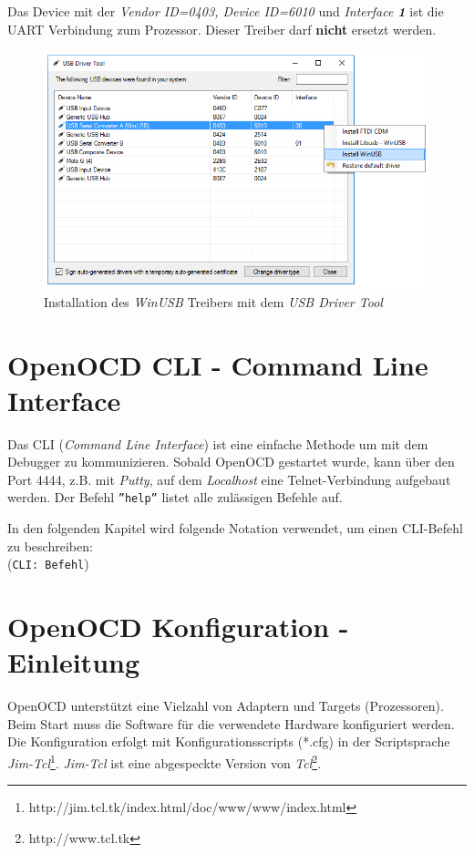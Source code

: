 Das Device mit der \textit{Vendor ID=0403, Device ID=6010} und \textit{Interface \textbf{1}} ist die UART Verbindung zum Prozessor.
Dieser Treiber darf \textbf{nicht} ersetzt werden.

\begin{figure}[htbp]
	\centering
		\includegraphics[width=12cm,keepaspectratio]{images/InstallWinUSBDriver.png}
	\caption{Installation des \textit{WinUSB} Treibers mit dem \textit{USB Driver Tool}}
	\label{fig:InstallWinUSBDriver}
\end{figure}


\section{OpenOCD CLI - Command Line Interface}
Das CLI (\textit{Command Line Interface}) ist eine einfache Methode um mit dem Debugger zu kommunizieren.
Sobald OpenOCD gestartet wurde, kann über den Port 4444, z.B. mit \textit{Putty}, auf dem \textit{Localhost} eine Telnet-Verbindung aufgebaut werden.
Der Befehl \texttt{''help''} listet alle zulässigen Befehle auf.

In den folgenden Kapitel wird folgende Notation verwendet, um einen CLI-Befehl zu beschreiben:\\
(\texttt{CLI: Befehl})


\section{OpenOCD Konfiguration - Einleitung}
OpenOCD unterstützt eine Vielzahl von Adaptern und Targets (Prozessoren).
Beim Start muss die Software für die verwendete Hardware konfiguriert werden.
Die Konfiguration erfolgt mit Konfigurationsscripts (*.cfg) in der Scriptsprache \textit{Jim-Tcl}\footnote{http://jim.tcl.tk/index.html/doc/www/www/index.html}.
\textit{Jim-Tcl} ist eine abgespeckte Version von \textit{Tcl}\footnote{http://www.tcl.tk}.


